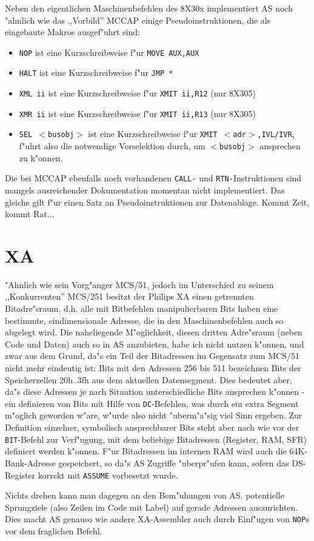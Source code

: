 \documentclass[12pt,a4paper,twoside]{report}
\newcommand{\tty}[1]{{\tt #1}}
\begin{document}
Neben den eigentlichen Maschinenbefehlen des 8X30x implementiert AS
noch "ahnlich wie das ,,Vorbild'' MCCAP einige Pseudoinstruktionen, die
als eingebaute Makros ausgef"uhrt sind:
\begin{itemize}
\item{\tty{NOP} ist eine Kurzschreibweise f"ur \tty{MOVE AUX,AUX}}
\item{\tty{HALT} ist eine Kurzschreibweise f"ur {\tt JMP \verb!*!}}
\item{\tty{XML ii} ist eine Kurzschreibweise f"ur \tty{XMIT ii,R12} (nur
      8X305)}
\item{\tty{XMR ii} ist eine Kurzschreibweise f"ur \tty{XMIT ii,R13} (nur
      8X305)}
\item{\tty{SEL $<$busobj$>$} ist eine Kurzschreibweise f"ur
      \tty{XMIT $<$adr$>$,IVL/IVR}, f"uhrt also die notwendige Vorselektion
      durch, um \tty{$<$busobj$>$} ansprechen zu k"onnen.}
\end{itemize}
Die bei MCCAP ebenfalls noch vorhandenen \tty{CALL-} und
\tty{RTN-}Instruktionen sind mangels ausreichender Dokumentation momentan
nicht implementiert. Das gleiche gilt f"ur einen Satz an
Pseudoinstruktionen zur Datenablage. Kommt Zeit, kommt Rat...


\section{XA}

"Ahnlich wie sein Vorg"anger MCS/51, jedoch im Unterschied zu seinem
,,Konkurrenten'' MCS/251 besitzt der Philips XA einen getrennten Bitadre"sraum,
d.h. alle mit Bitbefehlen manipulierbaren Bits haben eine
bestimmte, eindimensionale Adresse, die in den Maschinenbefehlen auch
so abgelegt wird.  Die naheliegende M"oglichkeit, diesen dritten
Adre"sraum (neben Code und Daten) auch so in AS anzubieten, habe ich
nicht nutzen k"onnen, und zwar aus dem Grund, da"s ein Teil der Bitadressen
im Gegensatz zum MCS/51 nicht mehr eindeutig ist: Bits mit
den Adressen 256 bis 511 bezeichnen Bits der Speicherzellen 20h..3fh
aus dem aktuellen Datensegment.  Dies bedeutet aber, da"s diese Adressen
je nach Situation unterschiedliche Bits ansprechen k"onnen - ein definieren
von Bits mit Hilfe von \tty{DC}-Befehlen, was durch ein extra Segment
m"oglich geworden w"are, w"urde also nicht "uberm"a"sig viel Sinn ergeben.
Zur Definition einzelner, symbolisch ansprechbarer Bits steht aber
nach wie vor der \tty{BIT}-Befehl zur Verf"ugung, mit dem beliebige Bitadressen
(Register, RAM, SFR) definiert werden k"onnen.  F"ur Bitadressen im
internen RAM wird auch die 64K-Bank-Adresse gespeichert, so da"s AS
Zugriffe "uberpr"ufen kann, sofern das DS-Register korrekt mit \tty{ASSUME}
vorbesetzt wurde.
\par
Nichts drehen kann man dagegen an den Bem"uhungen von AS, potentielle
Sprungziele (also Zeilen im Code mit Label) auf gerade Adressen
auszurichten.  Dies macht AS genauso wie andere XA-Assembler auch durch
Einf"ugen von \tty{NOP}s vor dem fraglichen Befehl.
\end{document}
